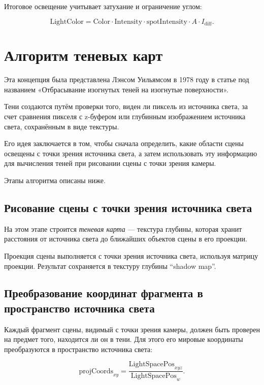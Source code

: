 Итоговое освещение учитывает затухание и ограничение углом:

\begin{equation}
    \label{equ:spot_lambert}
    \text{LightColor} = \text{Color} \cdot \text{Intensity} \cdot \text{spotIntensity} \cdot A \cdot I_{\text{diff}}.
\end{equation}

\section{Алгоритм теневых карт}

Эта концепция была представлена Лэнсом Уильямсом в 1978 году
в статье под названием «Отбрасывание изогнутых теней на изогнутые поверхности».~\cite{history}

Тени создаются путём проверки того, виден ли пиксель из источника света,
за счет сравнения пикселя с z-буфером или глубинным изображением источника света,
сохранённым в виде текстуры.~\cite{OpenGL_DevidVolf}

Его идея заключается в том, чтобы сначала определить,
какие области сцены освещены с точки зрения источника света,
а затем использовать эту информацию для вычисления теней
при рисовании сцены с точки зрения камеры.

Этапы алгоритма описаны ниже.

\subsection*{Рисование сцены с точки зрения источника света}

На этом этапе строится \textit{теневая карта} — текстура глубины,
которая хранит расстояния от источника света до ближайших объектов сцены в его проекции.

Проекция сцены выполняется с точки зрения источника света, используя матрицу проекции.
Результат сохраняется в текстуру глубины \enquote{shadow map}.

\subsection*{Преобразование координат фрагмента в пространство источника света}

Каждый фрагмент сцены, видимый с точки зрения камеры,
должен быть проверен на предмет того, находится ли он в тени.
Для этого его мировые координаты преобразуются в пространство источника света:

\begin{equation}
    \label{equ:projected_coords}
    \text{projCoords}_{xy} = \frac{\text{LightSpacePos}_{xyz}}{\text{LightSpacePos}_w}.
\end{equation}

